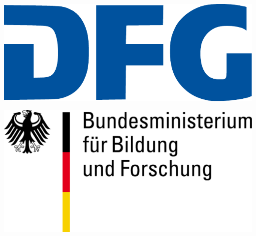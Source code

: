 \begin{frame}{}
\begin{changemargin}{-1cm}{-1cm}
{\begin{minipage}{\tmp}
		\end{minipage}
	}%
	{
		\begin{minipage}{\tmp}
			\includegraphics[width=\tmpp]{figures/logos/dfg.pdf}
		\end{minipage}
	}
	{
		\begin{minipage}{\tmp}
			\includegraphics[width=\tmpp]{figures/logos/bmbf.pdf}
		\end{minipage}
	}
	\end{changemargin}
\end{frame}